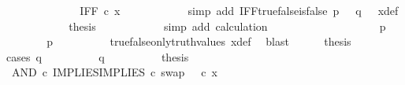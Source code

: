 \begin{isabellebody}
\ \ \ \ \ \ \ \ \isamarkupfalse%
\ \isamarkupfalse%
\ {\isachardoublequoteopen}{\isachardot}{\kern0pt}{\isachardot}{\kern0pt}{\isachardot}{\kern0pt}\ {\isacharequal}{\kern0pt}\ IFF\ {\isasymcirc}\isactrlsub c\ x{\isachardoublequoteclose}\isanewline
\ \ \ \ \ \ \ \ \ \ \isamarkupfalse%
\ {\isacharparenleft}{\kern0pt}simp\ add{\isacharcolon}{\kern0pt}\ IFF{\isacharunderscore}{\kern0pt}true{\isacharunderscore}{\kern0pt}false{\isacharunderscore}{\kern0pt}is{\isacharunderscore}{\kern0pt}false\ {\isacartoucheopen}p\ {\isacharequal}{\kern0pt}\ {\isasymt}{\isacartoucheclose}\ {\isacartoucheopen}q\ {\isacharequal}{\kern0pt}\ {\isasymf}{\isacartoucheclose}\ x{\isacharunderscore}{\kern0pt}def{\isacharparenright}{\kern0pt}\isanewline
\ \ \ \ \ \ \ \ \isamarkupfalse%
\ \isamarkupfalse%
\ {\isacharquery}{\kern0pt}thesis\isanewline
\ \ \ \ \ \ \ \ \ \ \isamarkupfalse%
\ {\isacharparenleft}{\kern0pt}simp\ add{\isacharcolon}{\kern0pt}\ calculation{\isacharparenright}{\kern0pt}\isanewline
\ \ \ \ \ \ \isamarkupfalse%
\isanewline
\ \ \ \ \isamarkupfalse%
\isanewline
\ \ \isamarkupfalse%
\isanewline
\ \ \ \ \isamarkupfalse%
\ {\isachardoublequoteopen}p\ {\isasymnoteq}\ {\isasymt}{\isachardoublequoteclose}\isanewline
\ \ \ \ \isamarkupfalse%
\ \isamarkupfalse%
\ {\isachardoublequoteopen}p\ {\isacharequal}{\kern0pt}\ {\isasymf}{\isachardoublequoteclose}\isanewline
\ \ \ \ \ \ \isamarkupfalse%
\ true{\isacharunderscore}{\kern0pt}false{\isacharunderscore}{\kern0pt}only{\isacharunderscore}{\kern0pt}truth{\isacharunderscore}{\kern0pt}values\ x{\isacharunderscore}{\kern0pt}def\ \isamarkupfalse%
\ blast\isanewline
\ \ \ \ \isamarkupfalse%
\ {\isacharquery}{\kern0pt}thesis\isanewline
\ \ \ \ \isamarkupfalse%
{\isacharparenleft}{\kern0pt}cases\ {\isachardoublequoteopen}q\ {\isacharequal}{\kern0pt}\ {\isasymt}{\isachardoublequoteclose}{\isacharparenright}{\kern0pt}\isanewline
\ \ \ \ \ \ \isamarkupfalse%
\ {\isachardoublequoteopen}q\ {\isacharequal}{\kern0pt}\ {\isasymt}{\isachardoublequoteclose}\isanewline
\ \ \ \ \ \ \isamarkupfalse%
\ {\isacharquery}{\kern0pt}thesis\isanewline
\ \ \ \ \ \ \isamarkupfalse%
\ {\isacharminus}{\kern0pt}\ \isanewline
\ \ \ \ \ \ \ \ \isamarkupfalse%
\ {\isachardoublequoteopen}{\isacharparenleft}{\kern0pt}AND\ {\isasymcirc}\isactrlsub c\ {\isasymlangle}IMPLIES{\isacharcomma}{\kern0pt}IMPLIES\ {\isasymcirc}\isactrlsub c\ swap\ {\isasymOmega}\ {\isasymOmega}{\isasymrangle}{\isacharparenright}{\kern0pt}\ {\isasymcirc}\isactrlsub c\ x\ {\isacharequal}{\kern0pt}\ \ \ \ \isanewline

\end{isabellebody}
